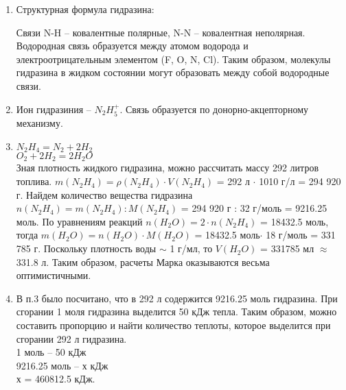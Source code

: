 \begin{enumerate}
    \item Структурная формула гидразина:
    \begin{center}
    \end{center}
    Связи N-H – ковалентные полярные, N-N – ковалентная неполярная. Водородная связь образуется между атомом водорода и электроотрицательным элементом (F, O, N, Cl). Таким образом, молекулы гидразина в жидком состоянии могут образовать между собой водородные связи.
    \item Ион гидразиния – $N_2H_5^+$. Связь образуется по донорно-акцепторному механизму.
    \item $N_2H_4 = N_2 + 2H_2$\\
    $O_2 + 2H_2 = 2H_2O$\\
    Зная плотность жидкого гидразина, можно рассчитать массу 292 литров топлива.
    $m(N_2H_4) = \rho(N_2H_4)\cdot V(N_2H_4)$ = 292 л $\cdot$ 1010 г/л = 294 920 г. Найдем количество вещества гидразина $n(N_2H_4) = m(N_2H_4) : M(N_2H_4)$ = 294 920 г : 32 г/моль = 9216.25 моль. По уравнениям реакций $n(H_2O) = 2\cdot n(N_2H_4)$ = 18432.5 моль, тогда $m(H_2O) = n(H_2O)\cdot M(H_2O)$ = 18432.5 моль$\cdot$ 18 г/моль = 331 785 г. Поскольку плотность воды $\sim$ 1 г/мл, то $V(H_2O)$ = 331785 мл $\approx$ 331.8 л. Таким образом, расчеты Марка оказываются весьма оптимистичными.
    \item В п.3 было посчитано, что в 292 л содержится 9216.25 моль гидразина. При сгорании 1 моля гидразина выделится 50 кДж тепла. Таким образом, можно составить пропорцию и найти количество теплоты, которое выделится при сгорании 292 л гидразина.\\
    1 моль – 50 кДж\\
    9216.25 моль – х кДж\\
    х = 460812.5 кДж.\\
    
\end{enumerate}